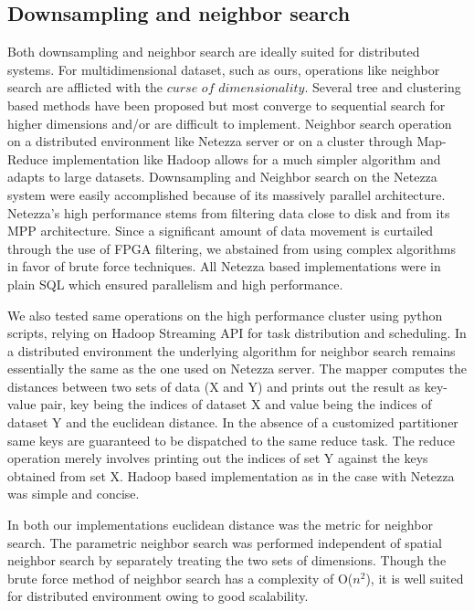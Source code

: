 \documentclass{acm_proc_article-sp}
\begin{document}
\subsection{Downsampling and neighbor search}
Both downsampling and neighbor search are ideally suited for distributed systems.
For multidimensional dataset, such as ours, operations like neighbor search are afflicted with the $\textit{curse of
dimensionality}$. Several tree and clustering based methods have been proposed but most converge to sequential search for higher dimensions
and/or are difficult to implement. Neighbor search operation 
on a distributed environment like Netezza server or on a cluster through Map-Reduce
implementation like Hadoop allows for a much simpler algorithm and adapts to large datasets.
Downsampling and Neighbor search on the Netezza system were easily accomplished because of its massively parallel architecture.
Netezza's high performance stems from filtering data close to disk and from its MPP architecture. Since a significant amount of data
movement is curtailed through the use of FPGA filtering, we abstained from using complex algorithms in favor of brute force
techniques. All Netezza based implementations were in plain SQL which ensured parallelism and high performance. 

We also tested same operations on the high performance cluster using python scripts, relying on Hadoop Streaming API for 
task distribution and scheduling. 
In a distributed environment the  underlying algorithm for neighbor search remains essentially the same as the
one used on Netezza server. The mapper  computes the distances between two sets of data (X and Y) and prints out the result as key-value
pair, key being the indices of dataset X and value being the indices of dataset Y  and the euclidean distance. 
In the absence of a customized partitioner
same keys are guaranteed to be dispatched to the same reduce task. The reduce operation merely involves printing out the indices of set Y
against the keys obtained from set X. Hadoop based implementation as in the case with Netezza was simple and concise.

In both our implementations euclidean distance was the metric for neighbor search.
The parametric neighbor search was performed independent of spatial neighbor search by
separately treating the two sets of dimensions. 
Though the brute force method of neighbor search has a complexity of O($n^{2}$), it is well suited for distributed environment
owing to good scalability.
\end{document}
